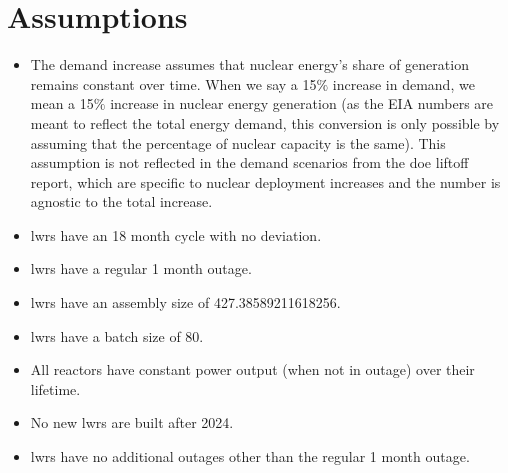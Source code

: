 \section{Assumptions}
\label{sec:assumptions}

\begin{itemize}
    \item The demand increase assumes that nuclear energy's share of generation remains constant over time. When we say a 15$\%$ increase in demand, we mean a 15$\%$ increase in nuclear energy generation (as the EIA numbers are meant to reflect the total energy demand, this conversion is only possible by assuming that the percentage of nuclear capacity is the same). This assumption is not reflected in the demand scenarios from the \gls{doe} liftoff report, which are specific to nuclear deployment increases and the number is agnostic to the total increase.
    \item \gls{lwr}s have an 18 month cycle with no deviation.
    \item \gls{lwr}s have a regular 1 month outage.
    \item \gls{lwr}s have an assembly size of 427.38589211618256.
    \item \gls{lwr}s have a batch size of 80.
    \item All reactors have constant power output (when not in outage) over their lifetime.
    \item No new \gls{lwr}s are built after 2024. %
    \item \gls{lwr}s have no additional outages other than the regular 1 month outage.
\end{itemize}